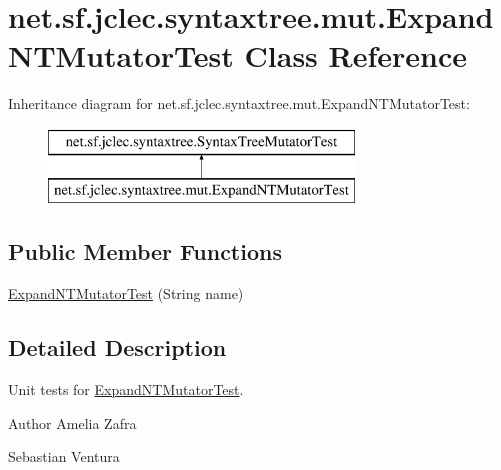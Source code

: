 \hypertarget{classnet_1_1sf_1_1jclec_1_1syntaxtree_1_1mut_1_1_expand_n_t_mutator_test}{\section{net.\-sf.\-jclec.\-syntaxtree.\-mut.\-Expand\-N\-T\-Mutator\-Test Class Reference}
\label{classnet_1_1sf_1_1jclec_1_1syntaxtree_1_1mut_1_1_expand_n_t_mutator_test}
}
Inheritance diagram for net.\-sf.\-jclec.\-syntaxtree.\-mut.\-Expand\-N\-T\-Mutator\-Test\-:\begin{figure}[H]
\begin{center}
\leavevmode
\includegraphics[height=2.000000cm]{classnet_1_1sf_1_1jclec_1_1syntaxtree_1_1mut_1_1_expand_n_t_mutator_test}
\end{center}
\end{figure}
\subsection*{Public Member Functions}
\begin{DoxyCompactItemize}
\item 
\hyperlink{classnet_1_1sf_1_1jclec_1_1syntaxtree_1_1mut_1_1_expand_n_t_mutator_test_a6615ff0e064ec04c1ac729016ca5531b}{Expand\-N\-T\-Mutator\-Test} (String name)
\end{DoxyCompactItemize}


\subsection{Detailed Description}
Unit tests for \hyperlink{classnet_1_1sf_1_1jclec_1_1syntaxtree_1_1mut_1_1_expand_n_t_mutator_test}{Expand\-N\-T\-Mutator\-Test}.

\begin{DoxyAuthor}{Author}
Amelia Zafra 

Sebastian Ventura 
\end{DoxyAuthor}


